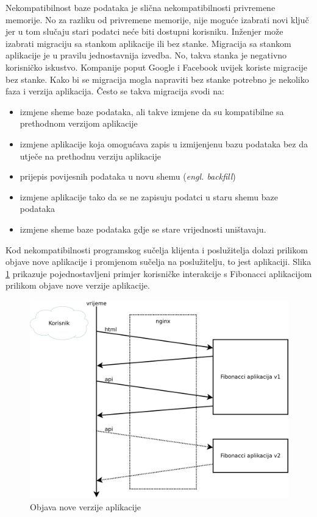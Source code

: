 Nekompatibilnost baze podataka je slična nekompatibilnosti privremene memorije. No za razliku od
privremene memorije, nije moguće izabrati novi ključ jer u tom slučaju stari podatci neće biti
dostupni korisniku. Inženjer može izabrati migraciju sa stankom aplikacije ili bez stanke. Migracija
sa stankom aplikacije je u pravilu jednostavnija izvedba. No, takva stanka je negativno korisničko
iskustvo. Kompanije poput Google i Facebook uvijek koriste migracije bez stanke. Kako bi se
migracija mogla napraviti bez stanke potrebno je nekoliko faza i verzija aplikacija. Često se takva
migracija svodi na:
\begin{itemize}
    \item izmjene sheme baze podataka, ali takve izmjene da su kompatibilne sa prethodnom verzijom
        aplikacije
    \item izmjene aplikacije koja omogućava zapis u izmijenjenu bazu podataka bez da utječe na
        prethodnu verziju aplikacije
    \item prijepis povijesnih podataka u novu shemu (\textit{engl. backfill})
    \item izmjene aplikacije tako da se ne zapisuju podatci u staru shemu baze podataka
    \item izmjene sheme baze podataka gdje se stare vrijednosti uništavaju.
\end{itemize}

Kod nekompatibilnosti programskog sučelja klijenta i poslužitelja dolazi prilikom objave nove
aplikacije i promjenom sučelja na poslužitelju, to jest aplikaciji. Slika \ref{fig:04request_flow}
prikazuje pojednostavljeni primjer korisničke interakcije s Fibonacci aplikacijom prilikom objave
nove verzije aplikacije.

\begin{figure}[h]
    \centering
    \includegraphics[width=\textwidth]{img/04/request_flow.png}
    \caption{Objava nove verzije aplikacije}%
    \label{fig:04request_flow}
\end{figure}

